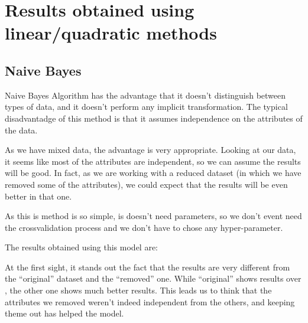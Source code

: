 %
\section{Results obtained using linear/quadratic methods}


\subsection{Naive Bayes}

Naive Bayes Algorithm has the advantage that it doesn't distinguish between types of data, and it doesn't perform any implicit transformation. The typical disadvantadge of this method is that it assumes independence on the attributes of the data.

As we have mixed data, the advantage is very appropriate. Looking at our data, it seems like most of the attributes are independent, so we can assume the results will be good. In fact, as we are working with a reduced dataset (in which we have removed some of the attributes), we could expect that the results will be even better in that one.

As this is method is so simple, is doesn't need parameters, so we don't event need the crossvalidation process and we don't have to chose any hyper-parameter.

The results obtained using this model are:


At the first sight, it stands out the fact that the results are very different from the ``original'' dataset and the ``removed'' one. While ``original'' shows results over , the other one shows much better results. This leads us to think that the attributes we removed weren't indeed independent from the others, and keeping theme out has helped the model.


